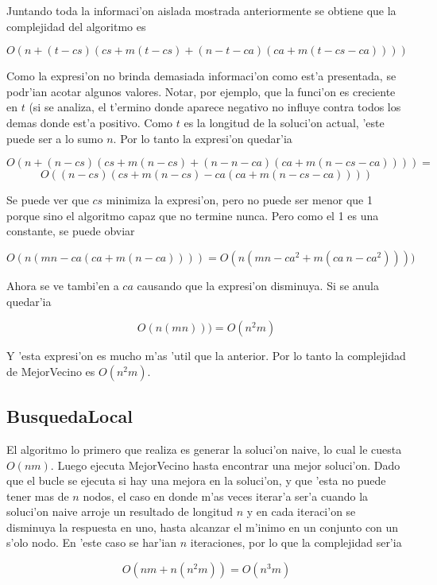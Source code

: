 Juntando toda la informaci'on aislada mostrada anteriormente se obtiene que la complejidad del algoritmo es

$$O(n + (t-cs)(cs+m(t-cs)+(n-t-ca)(ca+m(t-cs-ca))))$$

Como la expresi'on no brinda demasiada informaci'on como est'a presentada, se podr'ian acotar algunos valores. Notar, por ejemplo, que la funci'on es creciente en $t$ (si se analiza, el t'ermino donde aparece negativo no influye contra todos los demas donde est'a positivo. Como $t$ es la longitud de la soluci'on actual, 'este puede ser a lo sumo $n$. Por lo tanto la expresi'on quedar'ia

$$O(n + (n-cs)(cs+m(n-cs)+(n-n-ca)(ca+m(n-cs-ca)))) =$$
$$O((n-cs)(cs + m(n-cs) - ca(ca+m(n-cs-ca))))$$

Se puede ver que $cs$ minimiza la expresi'on, pero no puede ser menor que 1 porque sino el algoritmo capaz que no termine nunca. Pero como el 1 es una constante, se puede obviar

$$O(n(mn - ca(ca+m(n-ca)))) = O(n(mn - ca^2 + m(ca\ n-ca^2))))$$

Ahora se ve tambi'en a $ca$ causando que la expresi'on disminuya. Si se anula quedar'ia

$$O(n(mn))) = O(n^2m)$$

Y 'esta expresi'on es mucho m'as 'util que la anterior. Por lo tanto la complejidad de MejorVecino es $O(n^2m)$.

\subsection{BusquedaLocal}
El algoritmo lo primero que realiza es generar la soluci'on naive, lo cual le cuesta $O(nm)$. Luego ejecuta MejorVecino hasta encontrar una mejor soluci'on. Dado que el bucle se ejecuta si hay una mejora en la soluci'on, y que 'esta no puede tener mas de $n$ nodos, el caso en donde m'as veces iterar'a ser'a cuando la soluci'on naive arroje un resultado de longitud $n$ y en cada iteraci'on se disminuya la respuesta en uno, hasta alcanzar el m'inimo en un conjunto con un s'olo nodo. En 'este caso se har'ian $n$ iteraciones, por lo que la complejidad ser'ia

$$O(nm + n(n^2m)) = O(n^3m)$$
